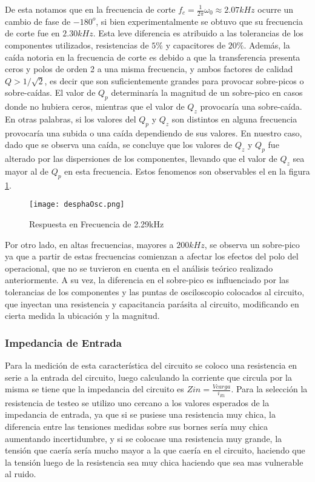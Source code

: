De esta notamos que en la frecuencia de corte $f_c = \frac{1}{2\pi}\omega_0 \approx 2.07kHz$ ocurre un cambio de fase de $-180^o$, si bien experimentalmente se obtuvo que su frecuencia de corte fue en $2.30kHz$. Esta leve diferencia es atribuido a las tolerancias de los componentes utilizados, resistencias de $5\%$ y capacitores de $20\%$. Además, la caída notoria en la frecuencia de corte es debido a que la transferencia presenta ceros y polos de orden 2 a una misma frecuencia, y ambos factores de calidad $Q > 1/\sqrt{2}$, es decir que son suficientemente grandes para provocar sobre-picos o sobre-caídas. El valor de $Q_p$ determinaría la magnitud de un sobre-pico en casos donde no hubiera ceros, mientras que el valor de $Q_z$ provocaría una sobre-caída. En otras palabras, si los valores del $Q_p$ y $Q_z$ son distintos en alguna frecuencia provocaría una subida o una caída dependiendo de sus valores. En nuestro caso, dado que se observa una caída, se concluye que los valores de $Q_z$ y $Q_p$ fue alterado por las dispersiones de los componentes, llevando que el valor de $Q_z$ sea mayor al de $Q_p$ en esta frecuencia. Estos fenomenos son observables el en la figura \ref{ej1despha}.

\begin{figure}[h]
    \centering
    \texttt{[image: desphaOsc.png]}
    \caption{Respuesta en Frecuencia de 2.29kHz}
    \label{ej1despha}
\end{figure}

Por otro lado, en altas frecuencias, mayores a $200kHz$, se observa un sobre-pico ya que a partir de estas frecuencias comienzan a afectar los efectos del polo del operacional, que no se tuvieron en cuenta en el análisis teórico realizado anteriormente. A su vez, la diferencia en el sobre-pico es influenciado por las tolerancias de los componentes y las puntas de osciloscopio colocados al circuito, que inyectan una resistencia y capacitancia parásita al circuito, modificando en cierta medida la ubicación y la magnitud. 

\subsubsection{Impedancia de Entrada}

Para la medición de esta característica del circuito se coloco una resistencia en serie a la entrada del circuito, luego calculando la corriente que circula por la misma se tiene que la impedancia del circuito es $Zin = \frac{Vcarga}{i_{R1}}$. Para la selección la resistencia de testeo se utilizo uno cercano a los valores esperados de la impedancia de entrada, ya que si se pusiese una resistencia muy chica, la diferencia entre las tensiones medidas sobre sus bornes ser\'ia muy chica aumentando incertidumbre, y si se colocase una resistencia muy grande, la tensi\'on que caer\'ia ser\'ia mucho mayor a la que caer\'ia en el circuito, haciendo que la tensi\'on luego de la resistencia sea muy chica haciendo que sea mas vulnerable al ruido.

